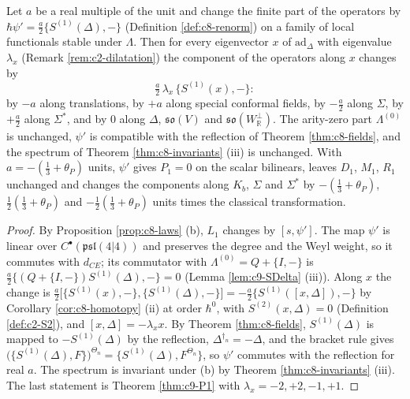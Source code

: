 \begin{proposition}
\label{prop:c9-scheme}
Let $a$ be a real multiple of the unit and change the finite part of the operators by $\hbar\psi'=\tfrac a2\{S^{(1)}(\Delta),-\}$ (Definition \ref{def:c8-renorm}) on a family of local functionals stable under $\Lambda$. Then for every eigenvector $x$ of $\mathrm{ad}_\Delta$ with eigenvalue $\lambda_x$ (Remark \ref{rem:c2-dilatation}) the component of the operators along $x$ changes by
\[
\tfrac a2\,\lambda_x\,\{S^{(1)}(x),-\}:
\]
by $-a$ along translations, by $+a$ along special conformal fields, by $-\tfrac a2$ along $\Sigma$, by $+\tfrac a2$ along $\Sigma^*$, and by $0$ along $\Delta$, $\mathfrak{so}(V)$ and $\mathfrak{so}(W_{\mathbb R}^\perp)$. The arity-zero part $\Lambda^{(0)}$ is unchanged, $\psi'$ is compatible with the reflection of Theorem \ref{thm:c8-fields}, and the spectrum of Theorem \ref{thm:c8-invariants} (iii) is unchanged. With $a=-(\tfrac13+\theta_P)$ units, $\psi'$ gives $P_1=0$ on the scalar bilinears, leaves $D_1$, $M_1$, $R_1$ unchanged and changes the components along $K_b$, $\Sigma$ and $\Sigma^*$ by $-(\tfrac13+\theta_P)$, $\tfrac12(\tfrac13+\theta_P)$ and $-\tfrac12(\tfrac13+\theta_P)$ units times the classical transformation.
\end{proposition}

\begin{proof}
By Proposition \ref{prop:c8-laws} (b), $L_1$ changes by $[s,\psi']$. The map $\psi'$ is linear over $C^\bullet(\mathfrak{psl}(4|4))$ and preserves the degree and the Weyl weight, so it commutes with $d_{CE}$; its commutator with $\Lambda^{(0)}=Q+\{I,-\}$ is $\tfrac a2\{(Q+\{I,-\})S^{(1)}(\Delta),-\}=0$ (Lemma \ref{lem:c9-SDelta} (iii)). Along $x$ the change is $\tfrac a2\big[\{S^{(1)}(x),-\},\{S^{(1)}(\Delta),-\}\big]=-\tfrac a2\{S^{(1)}([x,\Delta]),-\}$ by Corollary \ref{cor:c8-homotopy} (ii) at order $\hbar^0$, with $S^{(2)}(x,\Delta)=0$ (Definition \ref{def:c2-S2}), and $[x,\Delta]=-\lambda_x x$. By Theorem \ref{thm:c8-fields}, $S^{(1)}(\Delta)$ is mapped to $-S^{(1)}(\Delta)$ by the reflection, $\Delta^{\dagger_n}=-\Delta$, and the bracket rule gives $\big(\{S^{(1)}(\Delta),F\}\big)^{\Theta_n}=\{S^{(1)}(\Delta),F^{\Theta_n}\}$, so $\psi'$ commutes with the reflection for real $a$. The spectrum is invariant under (b) by Theorem \ref{thm:c8-invariants} (iii). The last statement is Theorem \ref{thm:c9-P1} with $\lambda_x=-2,+2,-1,+1$.
\end{proof}

